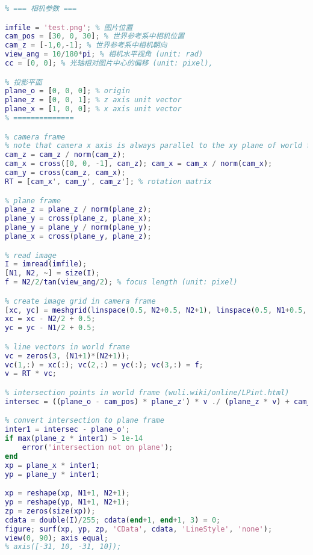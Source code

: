 \begin{lstlisting}[language=matlab]
% 参数中矢量不必归一化
% === 相机参数 ===

imfile = 'test.png'; % 图片位置
cam_pos = [30, 0, 30]; % 世界参考系中相机位置
cam_z = [-1,0,-1]; % 世界参考系中相机朝向
view_ang = 10/180*pi; % 相机水平视角 (unit: rad)
cc = [0, 0]; % 光轴相对图片中心的偏移 (unit: pixel),

% 投影平面
plane_o = [0, 0, 0]; % origin
plane_z = [0, 0, 1]; % z axis unit vector
plane_x = [1, 0, 0]; % x axis unit vector
% ==============

% camera frame
% note that camera x axis is always parallel to the xy plane of world frame
cam_z = cam_z / norm(cam_z);
cam_x = cross([0, 0, -1], cam_z); cam_x = cam_x / norm(cam_x);
cam_y = cross(cam_z, cam_x);
RT = [cam_x', cam_y', cam_z']; % rotation matrix

% plane frame
plane_z = plane_z / norm(plane_z);
plane_y = cross(plane_z, plane_x);
plane_y = plane_y / norm(plane_y);
plane_x = cross(plane_y, plane_z);

% read image
I = imread(imfile);
[N1, N2, ~] = size(I);
f = N2/2/tan(view_ang/2); % focus length (unit: pixel)

% create image grid in camera frame
[xc, yc] = meshgrid(linspace(0.5, N2+0.5, N2+1), linspace(0.5, N1+0.5, N1+1));
xc = xc - N2/2 + 0.5;
yc = yc - N1/2 + 0.5;

% line vectors in world frame
vc = zeros(3, (N1+1)*(N2+1));
vc(1,:) = xc(:); vc(2,:) = yc(:); vc(3,:) = f;
v = RT * vc;

% intersection points in world frame (wuli.wiki/online/LPint.html)
intersec = ((plane_o - cam_pos) * plane_z') * v ./ (plane_z * v) + cam_pos';

% convert intersection to plane frame
inter1 = intersec - plane_o';
if max(plane_z * inter1) > 1e-14
    error('intersection not on plane');
end
xp = plane_x * inter1;
yp = plane_y * inter1;

xp = reshape(xp, N1+1, N2+1);
yp = reshape(yp, N1+1, N2+1);
zp = zeros(size(xp));
cdata = double(I)/255; cdata(end+1, end+1, 3) = 0;
figure; surf(xp, yp, zp, 'CData', cdata, 'LineStyle', 'none');
view(0, 90); axis equal;
% axis([-31, 10, -31, 10]);
\end{lstlisting}
